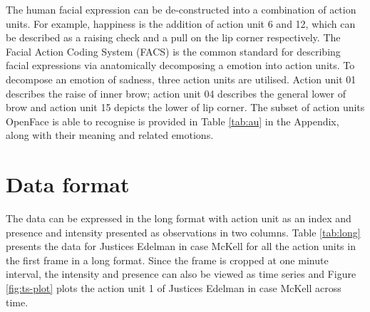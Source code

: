 \documentclass{monashthesis}
\begin{document}
The human facial expression can be de-constructed into a combination of action units. For example, happiness is the addition of action unit 6 and 12, which can be described as a raising check and a pull on the lip corner respectively. The Facial Action Coding System (FACS) is the common standard for describing facial expressions via anatomically decomposing a emotion into action units. To decompose an emotion of sadness, three action units are utilised. Action unit 01 describes the raise of inner brow; action unit 04 describes the general lower of brow and action unit 15 depicts the lower of lip corner. The subset of action units OpenFace is able to recognise is provided in Table \ref{tab:au} in the Appendix, along with their meaning and related emotions.

\hypertarget{data-format}{%
\section{Data format}\label{data-format}}

The data can be expressed in the long format with action unit as an index and presence and intensity presented as observations in two columns. Table \ref{tab:long} presents the data for Justices Edelman in case McKell for all the action units in the first frame in a long format. Since the frame is cropped at one minute interval, the intensity and presence can also be viewed as time series and Figure \ref{fig:ts-plot} plots the action unit 1 of Justices Edelman in case McKell across time.
\end{document}
